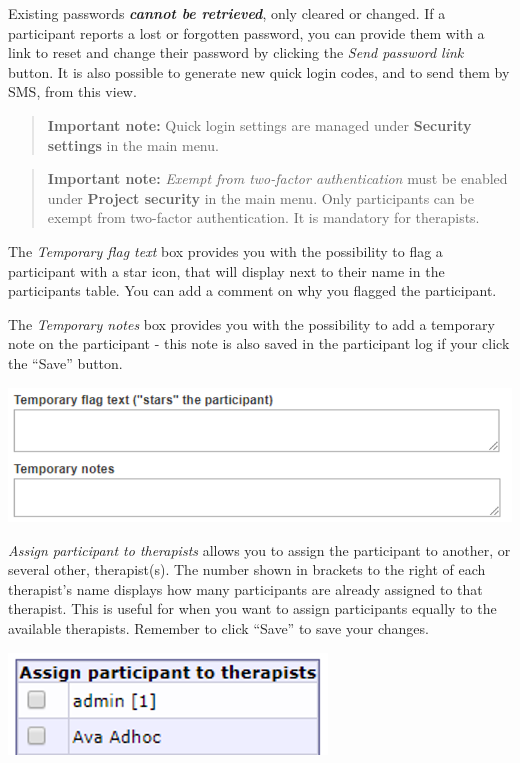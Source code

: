 \documentclass[
]{book}
\begin{document}
Existing passwords \emph{\textbf{cannot be retrieved}}, only cleared or changed. If a participant reports a lost or forgotten password, you can provide them with a link to reset and change their password by clicking the \emph{Send password link} button.
It is also possible to generate new quick login codes, and to send them by SMS, from this view.

\begin{quote}
\textbf{Important note:} Quick login settings are managed under \textbf{Security settings} in the main menu.
\end{quote}

\begin{quote}
\textbf{Important note:} \emph{Exempt from two-factor authentication} must be enabled under \textbf{Project security} in the main menu. Only participants can be exempt from two-factor authentication. It is mandatory for therapists.
\end{quote}

The \emph{Temporary flag text} box provides you with the possibility to flag a participant with a star icon, that will display next to their name in the participants table. You can add a comment on why you flagged the participant.

The \emph{Temporary notes} box provides you with the possibility to add a temporary note on the participant - this note is also saved in the participant log if your click the ``Save'' button.

\includegraphics{images/new-images/participantTempFlagNote.png}

\emph{Assign participant to therapists} allows you to assign the participant to another, or several other, therapist(s). The number shown in brackets to the right of each therapist's name displays how many participants are already assigned to that therapist. This is useful for when you want to assign participants equally to the available therapists.
Remember to click ``Save'' to save your changes.

\includegraphics{images/new-images/participantTherapists.png}
\end{document}
